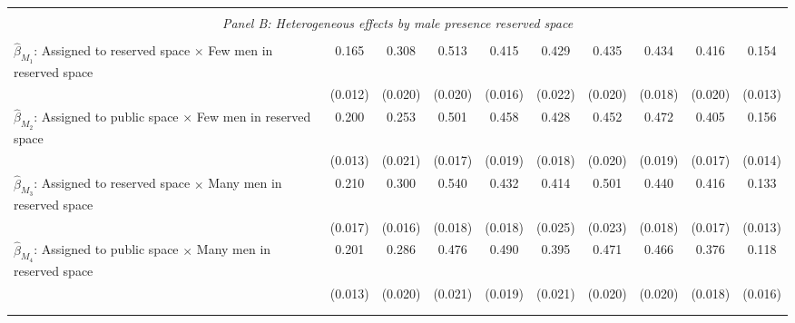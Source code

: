 \begin{tabular}{l*{9}{c}}
\hline \\[-1ex] \multicolumn{10}{c}{\textit{Panel B: Heterogeneous effects by male presence reserved space}} \\\\[-1ex]
$\hat\beta_{M_1}$: Assigned to reserved space $\times$ Few men in reserved space&       0.165\sym{***}&       0.308\sym{***}&       0.513\sym{***}&       0.415\sym{***}&       0.429\sym{***}&       0.435\sym{***}&       0.434\sym{***}&       0.416\sym{***}&       0.154\sym{***}\\
                    &     (0.012)         &     (0.020)         &     (0.020)         &     (0.016)         &     (0.022)         &     (0.020)         &     (0.018)         &     (0.020)         &     (0.013)         \\
[1em]
$\hat\beta_{M_2}$: Assigned to public space $\times$ Few men in reserved space&       0.200\sym{***}&       0.253\sym{***}&       0.501\sym{***}&       0.458\sym{***}&       0.428\sym{***}&       0.452\sym{***}&       0.472\sym{***}&       0.405\sym{***}&       0.156\sym{***}\\
                    &     (0.013)         &     (0.021)         &     (0.017)         &     (0.019)         &     (0.018)         &     (0.020)         &     (0.019)         &     (0.017)         &     (0.014)         \\
[1em]
$\hat\beta_{M_3}$: Assigned to reserved space $\times$ Many men in reserved space&       0.210\sym{***}&       0.300\sym{***}&       0.540\sym{***}&       0.432\sym{***}&       0.414\sym{***}&       0.501\sym{***}&       0.440\sym{***}&       0.416\sym{***}&       0.133\sym{***}\\
                    &     (0.017)         &     (0.016)         &     (0.018)         &     (0.018)         &     (0.025)         &     (0.023)         &     (0.018)         &     (0.017)         &     (0.013)         \\
[1em]
$\hat\beta_{M_4}$: Assigned to public space $\times$ Many men in reserved space&       0.201\sym{***}&       0.286\sym{***}&       0.476\sym{***}&       0.490\sym{***}&       0.395\sym{***}&       0.471\sym{***}&       0.466\sym{***}&       0.376\sym{***}&       0.118\sym{***}\\
                    &     (0.013)         &     (0.020)         &     (0.021)         &     (0.019)         &     (0.021)         &     (0.020)         &     (0.020)         &     (0.018)         &     (0.016)         \\
\\[-1.8ex] \hline \\[-1.8ex]  

\end{tabular}
